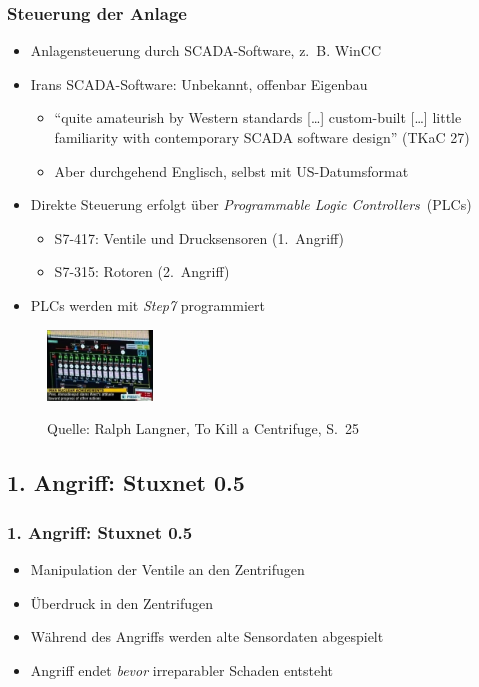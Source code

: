 \documentclass{beamer}
\begin{document}
\begin{frame}
  \frametitle{Steuerung der Anlage}
  \begin{itemize}
    \item Anlagensteuerung durch SCADA-Software, z.~B. WinCC
    \item Irans SCADA-Software: Unbekannt, offenbar Eigenbau
      \begin{itemize}
        \item ``quite amateurish by Western standards […] custom-built […] little familiarity with contemporary SCADA software design'' (TKaC 27)
        \item Aber durchgehend Englisch, selbst mit US-Datumsformat
      \end{itemize}
    \item Direkte Steuerung erfolgt über \emph{Programmable Logic Controllers}~(PLCs)
      \begin{itemize}
        \item S7-417: Ventile und Drucksensoren (1.~Angriff)
        \item S7-315: Rotoren (2.~Angriff)
      \end{itemize}
    \item PLCs werden mit \emph{Step7} programmiert
  \end{itemize}
  \begin{figure}
    \vspace{-0.2\textheight}
    \raggedleft
    \includegraphics[width=0.25\textwidth]{../SCADA.png}
    
    \tiny{Quelle: Ralph Langner, To Kill a Centrifuge, S.~25}
  \end{figure}
\end{frame}

\subsection{1. Angriff: Stuxnet 0.5}

\begin{frame}
  \frametitle{1. Angriff: Stuxnet 0.5}
  \begin{itemize}
    \item Manipulation der Ventile an den Zentrifugen
    \item Überdruck in den Zentrifugen
    \item Während des Angriffs werden alte Sensordaten abgespielt
    \item Angriff endet \emph{bevor} irreparabler Schaden entsteht
  \end{itemize}
\end{frame}
\end{document}
